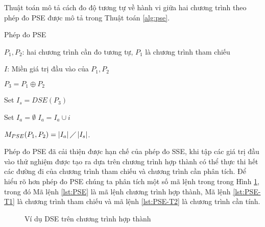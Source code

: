 Thuật toán mô tả cách đo độ tương tự về hành vi giữa hai chương trình 
theo phép đo PSE được mô tả trong Thuật toán \ref{alg:pse}.

 \begin{algorithm}[h]
   \caption{Phép đo PSE}
   \label{alg:pse}
   \begin{algorithmic}
   \item $P_{1}, P_{2}$: hai chương trình cần đo tương tự, $P_1$ là
     chương trình tham chiếu
   \item $I$: Miền giá trị đầu vào của $P_{1}, P_{2}$
   \item $P_{3} = P_1 \oplus P_2$
   \item Set $I_{s} = DSE(P_{3})$ 
   \item Set $I_{a} = \emptyset$ 
     	\State $I_{a} = I_{a} \cup i$ 
     	\EndIf 
     	\EndFor
   \item
     $M_{PSE}(P_{1}, P_{2}) = \left|I_{a}\right| \diagup
     \left|I_{s}\right| $.
   \end{algorithmic}
 \end{algorithm}

Phép đo PSE đã cải thiện được hạn chế của phép đo
 SSE, khi tập các giá trị đầu vào thử nghiệm được tạo ra dựa trên 
 chương trình hợp thành có thể thực thi hết các đường đi của chương 
 trình tham chiếu và chương trình cần phân tích. Để hiểu rõ hơn phép 
đo PSE chúng ta phân tích một số mã lệnh trong trong Hình \ref{fig:PSE}, 
trong đó Mã lệnh \ref{lst:PSE} là mã lệnh chương trình hợp thành, 
Mã lệnh \ref{lst:PSE-T1} là chương trình tham chiếu và mã lệnh 
\ref{lst:PSE-T2} là chương trình cần tính.

 \begin{figure}[h]
	\centering
	\caption{Ví dụ DSE trên chương trình hợp thành}
	\label{fig:PSE}
	\begin{minipage}[t]{0.3\linewidth}
		
	\end{minipage}%
	\hfill\vrule\hfill
	\begin{minipage}[t]{0.3\linewidth}
		
	\end{minipage}%
	\hfill\vrule\hfill
	\begin{minipage}[t]{0.3\linewidth}
		
	\end{minipage}%
\end{figure}

